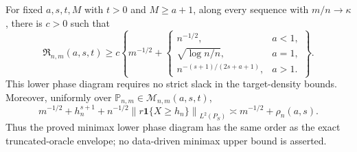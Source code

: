 For fixed \(a,s,t,M\) with \(t>0\) and \(M\ge a+1\), along every sequence with \(m/n\to\kappa\), there is \(c>0\) such that
\[
\mathfrak R_{n,m}(a,s,t)\ge c\left\{m^{-1/2}+\begin{cases}
n^{-1/2},&a<1,\\
\sqrt{\log n/n},&a=1,\\
n^{-(s+1)/(2s+a+1)},&a>1.
\end{cases}\right\}.
\]
This lower phase diagram requires no strict slack in the target-density bounds. Moreover, uniformly over \(\mathbb P_{n,m}\in\mathcal M_{n,m}(a,s,t)\),
\[
m^{-1/2}+h_n^{s+1}+n^{-1/2}\left\|r\mathbf 1\{X\ge h_n\}\right\|_{L^2(P_S)}
\asymp m^{-1/2}+\rho_n(a,s).
\]
Thus the proved minimax lower phase diagram has the same order as the exact truncated-oracle envelope; no data-driven minimax upper bound is asserted.